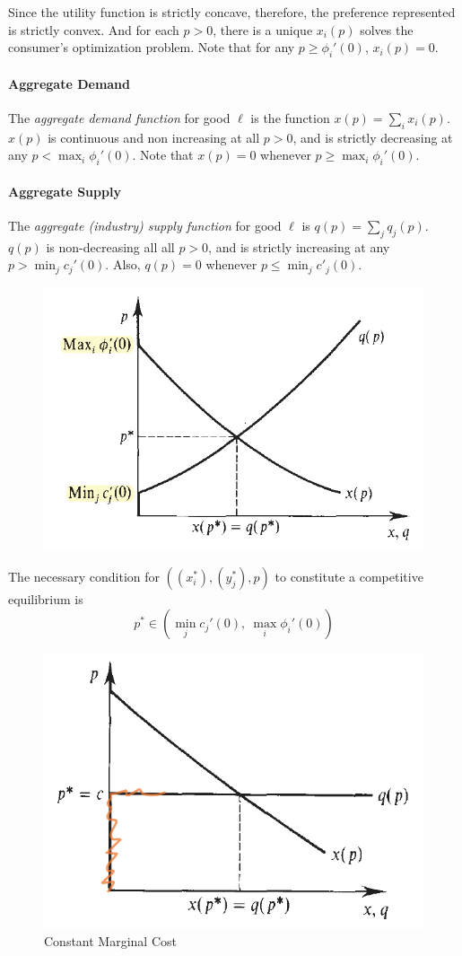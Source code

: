 \documentclass{report}
\begin{document}
	 	\begin{remark}
	 		Since the utility function is strictly concave, therefore, the preference represented is strictly convex. And for each $p > 0$, there is a unique $x_i(p)$ solves the consumer's optimization problem. Note that for any $p \geq \phi_i'(0)$, $x_i(p) = 0$.
	 	\end{remark}
	 	
	 	\paragraph{Aggregate Demand} The \emph{aggregate demand function} for good $\ell$ is the function $x(p) = \sum_i x_i(p)$. $x(p)$ is continuous and non increasing at all $p > 0$, and is strictly decreasing at any $p < \max_i \phi_i'(0)$. Note that $x(p) = 0$ whenever $p \geq \max_i \phi_i'(0)$.
	 	
	 	\paragraph{Aggregate Supply} The \emph{aggregate (industry) supply function} for good $\ell$ is $q(p) = \sum_j q_j(p)$. $q(p)$ is non-decreasing all all $p > 0$, and is strictly increasing at any $p > \min_j c_j'(0)$. Also, $q(p) = 0$ whenever $p \leq \min_j c'_j(0)$.
	 	\begin{figure}[h]
	 		\centering
	 		\includegraphics[width=0.5\linewidth]{figures/ASAD}
	 	\end{figure}
	 	
	 	\begin{remark}
	 		The necessary condition for $((x^*_i), (y^*_j), p)$ to constitute a competitive equilibrium is 
	 		\begin{equation}
	 			p^* \in \left (
	 				\min_j c_j'(0),\ \max_i \phi_i'(0)
	 			\right )
	 		\end{equation}
	 	\end{remark}
	 	
	 	\begin{figure}[h]
	 		\centering
	 		\includegraphics[width=0.5\linewidth]{figures/CSR}
	 		\caption{Constant Marginal Cost}
	 	\end{figure}
	 	
\end{document}
